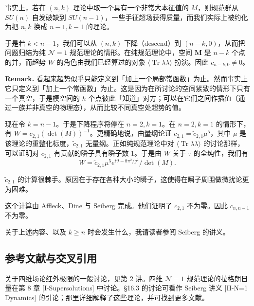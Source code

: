 
事实上，若在 $(n,k)$ 理论中取一个具有一个非常大本征值的 $M$，则规范群从 $SU(n)$ 自发破缺到 $SU(n-1)$，一些手征超场获得质量，而我们实际上被约化为把 $n,k$ 换成 $n-1,k-1$ 的理论。

于是若 $k<n-1$，我们可以从 $(n,k)$ 下降（descend）到 $(n-k,0)$，从而把问题归结为纯 $\mathcal{N}=1$ 规范理论的情形。在纯规范理论中，空间 $\mathbf{M}$ 是 $n-k$ 个点的并，而超势 $W$ 的角色由我们已经算过的对象 $\langle\operatorname{Tr}\lambda\lambda\rangle$ 扮演。因此 $c_{n-k,0}\ne0$。

\textbf{Remark.} 看起来超势似乎只能定义到「加上一个局部常函数」为止。然而事实上它只定义到「加上一个常函数」为止。这是因为在所讨论的空间紧致的情形下只有一个真空，于是模空间的 $h$ 个点彼此「知道」对方；可以在它们之间作插值（通过一族并非真空的物理态），从而比较不同真空处超势的值。

现在令 $k=n-1$。于是下降程序将停在 $n=2,k=1$。在 $n=2,k=1$ 的情形下，有 $W=c_{2,1}(\det(M))^{-1}$。更精确地说，由量纲论证 $c_{2,1}=\widetilde{c}_{2,1}\mu^5$，其中 $\mu$ 是该理论的重整化标度，$\widetilde{c}_{2,1}$ 无量纲。正如纯规范理论中对 $\langle\operatorname{Tr}\lambda\lambda\rangle$ 的讨论那样，可以证明对 $c_{2,1}$ 有贡献的瞬子具有瞬子数 $1$。于是由 $W$ 关于 $\tau$ 的全纯性，我们有
\begin{equation}
  \tag{16.11}
  \label{eq:16-11}
  W=\widetilde{c}_{2,1}\mu^5e^{i\vartheta-8\pi^2/g^2}/\det(M).
\end{equation}

$\widetilde{c}_{2,1}$ 的计算很棘手。原因在于存在各种大小的瞬子，这使得在瞬子周围做微扰论更为困难。

这个计算由 Affleck、Dine 与 Seiberg 完成。他们证明了 $c_{2,1}$ 不为零。因此 $c_{n,n-1}$ 不为零。

关于上述内容、以及 $k\ge n$ 时会发生什么，我请读者参阅 Seiberg 的讲义。

\subsection*{参考文献与交叉引用}

关于四维场论红外极限的一般讨论，见第 2 讲。四维 $\mathcal{N}=1$ 规范理论的拉格朗日量在第 8 章 [I-Supersolutions] 中讨论。§16.3 的讨论可看作 Seiberg 讲义 [II-N=1 Dynamics] 的引论；那里详细解释了这些理论，并可找到更多文献。
